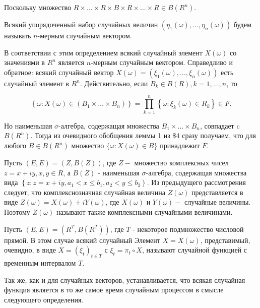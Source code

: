Поскольку множество $R \times \ldots \times R \times B \times R \times \ldots \times R \in {B}\left(R^{n}\right)$.

\begin{definition}
Всякий упорядоченный набор случайных величин $\left(\eta_{1}(\omega), \ldots, \eta_{n}(\omega)\right)$ будем называть $n$-мерным случайным вектором.
\end{definition}

В соответствии с этим определением всякий случайный элемент $X(\omega)$ со значениями в $R^{n}$ является $n$-мерным случайным вектором. Справедливо и обратное: всякий случайный вектор $X(\omega)=\left(\xi_{1}(\omega), \ldots, \xi_{n}(\omega)\right)$ есть случайный элемент в $R^{n}$. Действительно, если $B_{k} \in {B}(R), k=1, \ldots, n$, то

$$
\left\{\omega: X(\omega) \in\left(B_{1} \times \ldots \times B_{n}\right)\right\}=\prod_{k=1}^{n}\left\{\omega: \xi_{k}(\omega) \in R_{k}\right\} \in {F} .
$$

Но наименьшая $\sigma$-алгебра, содержащая множества $B_{1} \times \ldots \times B_{n}$, совпадает c ${B}\left(R^{n}\right)$. Тогда из очевидного обобщения леммы 1 из $\$ 4$ сразу получаем, что для любого $B \in {B}\left(R^{n}\right)$ множество $\{\omega: X(\omega) \in B\}$ принадлежит ${F}$.

Пусть $(E, {E})=({Z}, {B}({Z}))$, где ${Z}-$ множество комплексных чисел $z=x+i y, x, y \in R$, а ${B}({Z})$ - наименьшая $\sigma$-алгебра, содержащая множества вида
\newline
$\left\{z: z=x+i y, a_{1}<x \leqslant b_{1}, a_{2}<y \leqslant b_{2}\right\}$. 
\newline
Из предыдущего рассмотрения следует, что комплекснозначная случайная величина $Z(\omega)$ представляется в виде $Z(\omega)=X(\omega)+i Y(\omega)$, где $X(\omega)$ и $Y(\omega)-$ случайные величины. Поэтому $Z(\omega)$ называют также комплексными случайными величинами.

Пусть $(E, {E})=\left(R^{T}, {B}\left(R^{T}\right)\right)$, где $T$ - некоторое подмножество числовой прямой. В этом случае всякий случайный Элемент $X=X(\omega)$, представимый, очевидно, в виде $X=\left(\xi_{t}\right)_{t \in T}$ с $\xi_{t}=\pi_{t} \circ X$, называют случайной функцией с временным интервалом $T$.

Так же, как и для случайных векторов, устанавливается, что всякая случайная функция является в то же самое время случайным процессом в смысле следующего определения.

